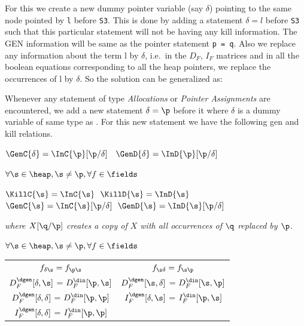 For this we create a new dummy pointer variable (say $\delta$) pointing to the same node pointed by {\tt l} before {\tt S3}.
This is done by adding a statement $\delta = l$ before {\tt S3} such that this particular statement will not be having
any kill information. The GEN information will be same as the pointer statement {\tt p = q}. Also we replace any information about the term 
l by $\delta$, i.e.\ in the $D_F$, $I_F$ matrices and in all the boolean equations corresponding to all the heap pointers, we replace 
the occurrences of l by  $\delta$.
So the solution can be generalized as:

Whenever any statement of type \textit{Allocations} or \textit{Pointer Assignments} are encountered, we add a new statement
$\delta = \p$ before it where $\delta$ is a dummy variable of same type as \p. For this new statement 
we have the following gen and kill relations.

\begin{center}
$\GenC{\delta}   = \InC{\p}[\p/\delta] \quad \GenD{\delta} = \InD{\p}[\p/\delta]$ \\
\end{center}
$\forall \s \in \heap, \s \not= \p, \forall f \in \fields$ 
\begin{center}
$\KillC{\s}   = \InC{\s}  \ \ \KillD{\s} = \InD{\s}$  \\
$\GenC{\s}   = \InC{\s}[\p/\delta] \ \  \GenD{\s} = \InD{\s}[\p/\delta]$ \\ 	 
\end{center}

      
	\textit{where $X[\q / \p]$ creates a copy of $X$ with all occurrences
	of $\q$ replaced by $\p$.}

$\forall \s \in \heap, \s \not= \p, \forall f \in \fields$ 

\begin{center}
\begin{tabular}{cc}
$f_{\delta\s} = f_{\p\s}$  &  $f_{\s\delta} = f_{\s\p}$ \\

$D_F^{\dgen}[\delta,\s]$    =  $D_F^{\din}[\p,\s]$ &  $D_F^{\dgen}[\s,\delta]$    =  $D_F^{\din}[\s,\p]$   \\

$D_F^{\dgen}[\delta,\delta]$    =  $D_F^{\din}[\p,\p]$  &  $I_F^{\dgen}[\delta,\s]$    =   $I_F^{\din}[\p,\s]$ \\

$I_F^{\dgen}[\delta,\delta]$    = $I_F^{\din}[\p,\p]$  \\
\end{tabular}
\end{center}

